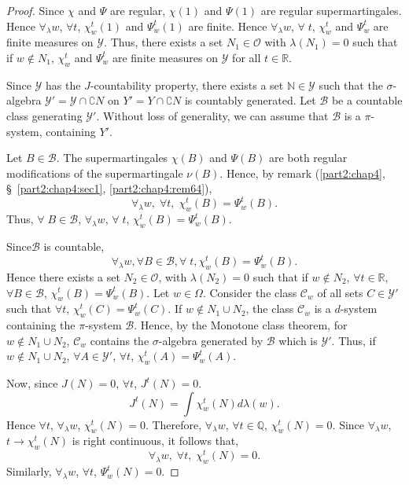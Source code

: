 \begin{proof}
Since $\chi$ and $\Psi$ are regular, $\chi(1)$ and $\Psi(1)$ are
regular supermartingales. Hence $\forall_\lambda w$, $\forall t$,
$\chi^t_w(1)$ and $\Psi^t_w(1)$ are finite. Hence $\forall_\lambda w$,
$\forall \; t$, $\chi^t_w$ and $\Psi^t_w$ are finite measures on
$\mathscr{Y}$. Thus, there exists a set $N_1 \in \mathscr{O}$ with
$\lambda(N_1) =0$ such that if $w \not\in N_1$, $\chi^t_w$ and
$\Psi^t_w$ are finite measures on $\mathscr{Y}$ for all $t \in
\mathbb{R}$.

Since $\mathscr{Y}$ has the $J$-countability property, there exists a
set $\mathbb{N} \in \mathscr{Y}$ such that the $\sigma$-algebra
$\mathscr{Y}'= \mathscr{Y} \cap \complement N$ on $Y' = Y \cap
\complement N$ is countably generated. Let $\mathscr{B}$ be a
countable class generating $\mathscr{Y}'$. Without loss of generality,
we can assume that $\mathscr{B}$ is a $\pi$-system, containing $Y'$. 

Let $B \in \mathscr{B}$. The supermartingales $\chi(B)$ and $\Psi(B)$
are both regular modifications of the supermartingale $\nu(B)$. Hence,
by remark (\ref{part2:chap4}, \S\ \ref{part2:chap4:sec1},
\ref{part2:chap4:rem64}), 
$$
\forall_\lambda w, \; \forall t, \; \chi^t_w (B) = \Psi^t_w (B). 
$$
Thus, $\forall \; B \in \mathscr{B}$, $\forall_\lambda w$, $\forall \;
t$, $\chi^t_w(B) = \Psi^t_w(B)$. 


Since\pageoriginale $\mathscr{B}$ is countable,
$$
\forall_\lambda w, \forall B \in\mathscr{B}, \forall \; t, \chi^t_w
(B) = \Psi^t_w (B). 
$$
Hence there exists a set $N_2 \in \mathscr{O}$, with $\lambda(N_2)=0$
such that if $w \not\in N_2$, $\forall t \in \mathbb{R}$, $\forall B
\in \mathscr{B}$, $\chi^t_w (B) = \Psi^t_w(B)$. Let $w \in
\Omega$. Consider the class $\mathscr{C}_w$ of all sets $C \in
\mathscr{Y}'$ such that $\forall t$, $\chi^t_w(C) = \Psi^t_w(C)$. If
$w \not\in N_1 \cup N_2$, the class $\mathscr{C}_w$ is a $d$-system
containing the $\pi$-system $\mathscr{B}$. Hence, by the Monotone
class theorem, for $w \not\in N_1 \cup N_2$, $\mathscr{C}_w$ contains
the $\sigma$-algebra generated by $\mathscr{B}$ which is
$\mathscr{Y}'$. Thus, if $w \not\in N_1 \cup N_2$, $\forall A \in
\mathscr{Y}'$, $\forall t$, $\chi^t_w(A) = \Psi^t_w(A)$.

Now, since $J(N) = 0$, $\forall t$, $J^t (N) =0$. 
$$
J^t (N) = \int \chi^t_w (N) d\lambda(w). 
$$
Hence $\forall t$, $\forall_\lambda w$, $\chi^t_w(N) =0$. Therefore,
$\forall_\lambda w$, $\forall t \in\mathbb{Q}$, $\chi^t_w(N)
=0$. Since $\forall_\lambda w$, $t \to \chi^t_w(N)$ is right
continuous, it follows that,
$$
\forall_\lambda w, \; \forall t, \; \chi^t_w(N) = 0. 
$$
Similarly, $\forall_\lambda w$, $\forall t$, $\Psi^t_w(N) =0$.


\end{proof}
